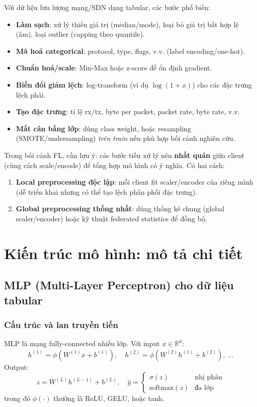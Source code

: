 \documentclass[12pt,a4paper]{article}
\begin{document}
Với dữ liệu lưu lượng mạng/SDN dạng tabular, các bước phổ biến:
\begin{itemize}
    \item \textbf{Làm sạch}: xử lý thiếu giá trị (median/mode), loại bỏ giá trị bất hợp lệ (âm), loại outlier (capping theo quantile).
    \item \textbf{Mã hoá categorical}: protocol, type, flags, v.v. (label encoding/one-hot).
    \item \textbf{Chuẩn hoá/scale}: Min-Max hoặc z-score để ổn định gradient.
    \item \textbf{Biến đổi giảm lệch}: log-transform (ví dụ $\log(1+x)$) cho các đặc trưng lệch phải.
    \item \textbf{Tạo đặc trưng}: tỉ lệ rx/tx, byte per packet, packet rate, byte rate, v.v.
    \item \textbf{Mất cân bằng lớp}: dùng class weight, hoặc resampling (SMOTE/undersampling) \emph{trên train} nếu phù hợp bối cảnh nghiên cứu.
\end{itemize}

Trong bối cảnh FL, cần lưu ý: các bước tiền xử lý nên \textbf{nhất quán} giữa client (cùng cách scale/encode) để tổng hợp mô hình có ý nghĩa. Có hai cách:
\begin{enumerate}
    \item \textbf{Local preprocessing độc lập}: mỗi client fit scaler/encoder của riêng mình (dễ triển khai nhưng có thể tạo lệch phân phối đặc trưng).
    \item \textbf{Global preprocessing thống nhất}: dùng thống kê chung (global scaler/encoder) hoặc kỹ thuật federated statistics để đồng bộ.
\end{enumerate}

\section{Kiến trúc mô hình: mô tả chi tiết}

\subsection{MLP (Multi-Layer Perceptron) cho dữ liệu tabular}

\subsubsection{Cấu trúc và lan truyền tiến}
MLP là mạng fully-connected nhiều lớp. Với input $x\in\mathbb{R}^d$:
\[
h^{(1)} = \phi\!\left(W^{(1)}x + b^{(1)}\right),
\quad
h^{(2)} = \phi\!\left(W^{(2)}h^{(1)} + b^{(2)}\right),
\ \dots
\]
Output:
\[
z = W^{(L)}h^{(L-1)} + b^{(L)},
\quad
\hat y = 
\begin{cases}
\sigma(z) & \text{nhị phân}\\
\text{softmax}(z) & \text{đa lớp}
\end{cases}
\]
trong đó $\phi(\cdot)$ thường là ReLU, GELU, hoặc tanh.
\end{document}
